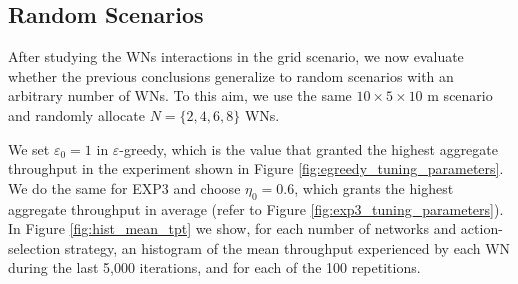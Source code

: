 \documentclass[preprint,12pt]{elsarticle}
\begin{document}
\subsection{Random Scenarios}
\label{section:random}
After studying the WNs interactions in the grid scenario, we now evaluate whether the previous conclusions generalize to random scenarios with an arbitrary number of WNs. To this aim, we use the same $10\times5\times 10$ m scenario and randomly allocate $N = \{2, 4, 6, 8\}$ WNs. %

We set $\varepsilon_0 = 1$ in $\varepsilon$-greedy, which is the value that granted the highest aggregate throughput in the experiment shown in Figure \ref{fig:egreedy_tuning_parameters}. We do the same for EXP3 and choose $\eta_0 = 0.6$, which grants the highest aggregate throughput in average (refer to Figure \ref{fig:exp3_tuning_parameters}). In Figure \ref{fig:hist_mean_tpt} we show, for each number of networks and action-selection strategy, an histogram of the mean throughput experienced by each WN during the last 5,000 iterations, and for each of the 100 repetitions.
\end{document}
